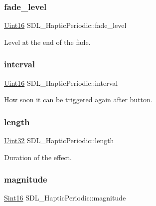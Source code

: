 \subsubsection{\texorpdfstring{fade\+\_\+level}{fade\_level}}
{\footnotesize\ttfamily \mbox{\hyperlink{_s_d_l__stdinc_8h_a31fcc0a076c9068668173ee26d33e42b}{Uint16}} S\+D\+L\+\_\+\+Haptic\+Periodic\+::fade\+\_\+level}

Level at the end of the fade. \mbox{\label{struct_s_d_l___haptic_periodic_a076d266e917098d89b2385b631629162}} 
\subsubsection{\texorpdfstring{interval}{interval}}
{\footnotesize\ttfamily \mbox{\hyperlink{_s_d_l__stdinc_8h_a31fcc0a076c9068668173ee26d33e42b}{Uint16}} S\+D\+L\+\_\+\+Haptic\+Periodic\+::interval}

How soon it can be triggered again after button. \mbox{\label{struct_s_d_l___haptic_periodic_a0ef0b17c54aaa5c99886c2a618444026}} 
\subsubsection{\texorpdfstring{length}{length}}
{\footnotesize\ttfamily \mbox{\hyperlink{_s_d_l__stdinc_8h_add440eff171ea5f55cb00c4a9ab8672d}{Uint32}} S\+D\+L\+\_\+\+Haptic\+Periodic\+::length}

Duration of the effect. \mbox{\label{struct_s_d_l___haptic_periodic_aad0ad2b00c7e6959da627663d91f7b94}} 
\subsubsection{\texorpdfstring{magnitude}{magnitude}}
{\footnotesize\ttfamily \mbox{\hyperlink{_s_d_l__stdinc_8h_a9d0257032c0e146ab6121bf0122712f5}{Sint16}} S\+D\+L\+\_\+\+Haptic\+Periodic\+::magnitude}

